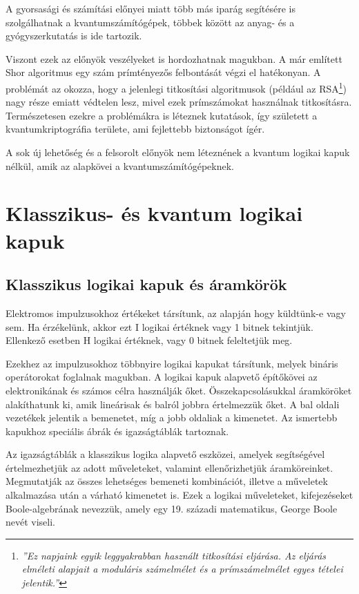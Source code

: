 \documentclass[
]{thesis-ekf}
\theoremstyle{definition}
\theoremstyle{remark}
\begin{document}
A gyorsasági és számítási előnyei miatt több más iparág segítésére is szolgálhatnak a kvantumszámítógépek, többek között az anyag- és a gyógyszerkutatás is ide tartozik.

Viszont ezek az előnyök veszélyeket is hordozhatnak magukban. A már említett Shor algoritmus egy szám prímtényezős felbontását végzi el hatékonyan. A problémát az okozza, hogy a jelenlegi titkosítási algoritmusok (például az RSA\footnote{\emph{''Ez napjaink egyik leggyakrabban használt titkosítási eljárása. Az eljárás elméleti alapjait a moduláris számelmélet és a prímszámelmélet egyes tételei jelentik.''\cite{RSA}}}) nagy része emiatt védtelen lesz, mivel ezek prímszámokat használnak titkosításra. Természetesen ezekre a problémákra is léteznek kutatások, így született a kvantumkriptográfia területe, ami fejlettebb biztonságot ígér.\cite{BiróKoczkaPrantner}

A sok új lehetőség és a felsorolt előnyök nem léteznének a kvantum logikai kapuk nélkül, amik az alapkövei a kvantumszámítógépeknek.

\chapter{Klasszikus- és kvantum logikai kapuk}
\section{Klasszikus logikai kapuk és áramkörök}
Elektromos impulzusokhoz értékeket társítunk, az alapján hogy küldtünk-e vagy sem. Ha érzékelünk, akkor ezt I logikai értéknek vagy 1 bitnek tekintjük. Ellenkező esetben H logikai értéknek, vagy 0 bitnek feleltetjük meg.

Ezekhez az impulzusokhoz többnyire logikai kapukat társítunk, melyek bináris operátorokat foglalnak magukban. A logikai kapuk alapvető építőkövei az elektronikának és számos célra használják őket. Összekapcsolásukkal áramköröket alakíthatunk ki, amik lineárisak és balról jobbra értelmezzük őket. A bal oldali vezetékek jelentik a bemenetet, míg a jobb oldaliak a kimenetet. Az ismertebb kapukhoz speciális ábrák és igazságtáblák tartoznak.

Az igazságtáblák a klasszikus logika alapvető eszközei, amelyek segítségével értelmezhetjük az adott műveleteket, valamint ellenőrizhetjük áramköreinket. Megmutatják az összes lehetséges bemeneti kombinációt, illetve a műveletek alkalmazása után a várható kimenetet is. Ezek a logikai műveleteket, kifejezéseket Boole-algebrának nevezzük, amely egy 19. századi matematikus, George Boole nevét viseli.\cite{Chris Bernhardt}
\end{document}
